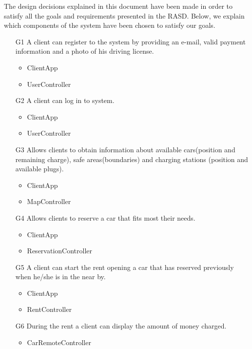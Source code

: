 The design decisions explained in this document have been made in order to satisfy all the goals and requirements presented in the RASD. 
Below, we explain which components of the system have been chosen to satisfy our goals.



\begin{itemize}
\item [G1]A client can register to the system by providing an e-mail, valid payment information and a photo of his driving license.
\begin{itemize}
\item ClientApp
\item UserController
\end{itemize}

\item [G2]A client can log in to system.
\begin{itemize}
\item ClientApp
\item UserController
\end{itemize}

\item [G3]Allows clients to obtain information about available cars(position and remaining charge), safe areas(boundaries) and charging stations (position and available plugs).
\begin{itemize}
\item ClientApp
\item MapController
\end{itemize}

\item [G4]Allows clients to reserve a car that fits most their needs.
\begin{itemize}
\item ClientApp
\item ReservationController
\end{itemize}

\item [G5]A client can start the rent opening a car that has reserved previously when he/she is in the near by.
\begin{itemize}
\item ClientApp
\item RentController
\end{itemize}

\item [G6]During the rent a client can display the amount of money charged.
\begin{itemize}
\item CarRemoteController
\end{itemize}


\end{itemize}

